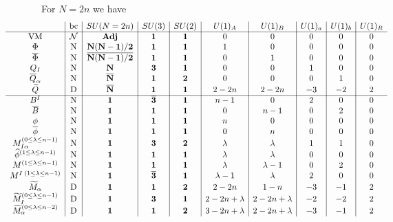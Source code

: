\documentclass[12pt]{article}
\numberwithin{equation}{section}
\begin{document}
For $N = 2n$ we have
\begin{align}
\hspace*{-1.5cm}
\label{SU2n_AS_charges}
\begin{array}{c|c|c|c|c|c|c|c|c|c}
& \textrm{bc} & SU(N = 2n) & SU(3) & SU(2) & U(1)_A & U(1)_B & U(1)_a & U(1)_b & U(1)_R \\ \hline
\textrm{VM} & \mathcal{N} & {\bf Adj} & {\bf 1} & {\bf 1} & 0 & 0 & 0 & 0 & 0 \\
\Phi & \textrm{N} & {\bf N(N-1)/2} & {\bf 1} & {\bf 1} & 1 & 0 & 0 & 0 & 0 \\
\overline{\Phi} & \textrm{N} & {\bf \overline{N(N-1)/2}} & {\bf 1} & {\bf 1} & 0 & 1 & 0 & 0 & 0 \\
Q_I & \textrm{N} & {\bf N} & {\bf 3} & {\bf 1} & 0 & 0 & 1 & 0 & 0 \\
\overline{Q}_{\alpha} & \textrm{N} & {\bf \overline{N}} & {\bf 1} & {\bf 2} & 0 & 0 & 0 & 1 & 0 \\
\widetilde{Q} & \textrm{D} & {\bf \overline{N}} & {\bf 1} & {\bf 1} & 2-2n & 2-2n & -3 & -2 & 2 \\ \hline
B^I & \textrm{N} & {\bf 1} & {\bf \overline{3}} & {\bf 1} & n-1 & 0 & 2 & 0 & 0 \\
\overline{B} & \textrm{N} & {\bf 1} & {\bf 1} & {\bf 1} & 0 & n-1 & 0 & 2 & 0 \\
\phi & \textrm{N} & {\bf 1} & {\bf 1} & {\bf 1} & n & 0 & 0 & 0 & 0 \\
\overline{\phi} & \textrm{N} & {\bf 1} & {\bf 1} & {\bf 1} & 0 & n & 0 & 0 & 0 \\
M^{(0 \le \lambda \le n-1)}_{I \alpha} & \textrm{N} & {\bf 1} & {\bf 3} & {\bf 2} & \lambda&\lambda& 1 & 1 & 0 \\
\widehat{\phi}^{(1 \le \lambda \le n-1)} & \textrm{N} & {\bf 1} & {\bf 1} & {\bf 1} & \lambda & \lambda & 0 & 0 & 0 \\
M^{(1 \le \lambda \le n-1)} & \textrm{N} & {\bf 1} & {\bf 1} & {\bf 1} & \lambda & \lambda-1 & 0 & 2 & 0 \\
M^{I \; (1 \le \lambda \le n-1)} & \textrm{N} & {\bf 1} & {\bf \overline{3}} & {\bf 1} & \lambda-1 & \lambda & 2 & 0 & 0 \\
\widetilde{M}_{\alpha} & \textrm{D} & {\bf 1} & {\bf 1} & {\bf 2} & 2-2n & 1-n & -3 & -1 & 2 \\
\widetilde{M}^{(0 \le \lambda \le n-1)}_I & \textrm{D} & {\bf 1} & {\bf 3} & {\bf 1} & 2-2n+\lambda & 2-2n+\lambda & -2 & -2 & 2 \\
\widetilde{M}^{(0 \le \lambda \le n-2)}_{\alpha} & \textrm{D} & {\bf 1} & {\bf 1} & {\bf 2} & 3 - 2n + \lambda & 2 - 2n + \lambda & -3 & -1 & 2
\end{array}
\end{align}
\end{document}
